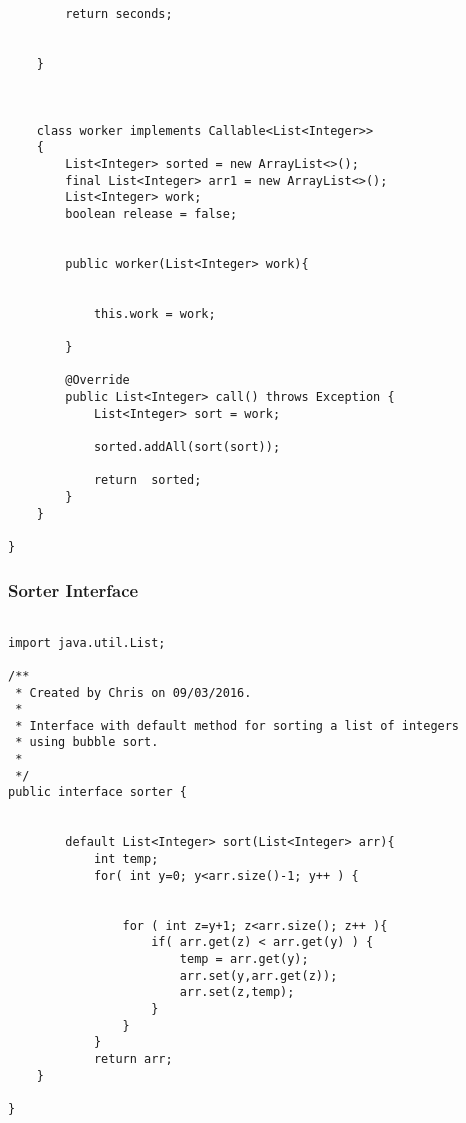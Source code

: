 \documentclass[11pt]{article}  %
\theoremstyle{definition}
\theoremstyle{remark}
\begin{document}
\begin{appendices}
\begin{lstlisting}
        return seconds;


    }



    class worker implements Callable<List<Integer>>
    {
        List<Integer> sorted = new ArrayList<>();
        final List<Integer> arr1 = new ArrayList<>();
        List<Integer> work;
        boolean release = false;


        public worker(List<Integer> work){


            this.work = work;

        }

        @Override
        public List<Integer> call() throws Exception {
            List<Integer> sort = work;

            sorted.addAll(sort(sort));

            return  sorted;
        }
    }

}

\end{lstlisting}

\newpage
\subsubsection{Sorter Interface}\label{1} 
  \begin{lstlisting}

import java.util.List;

/**
 * Created by Chris on 09/03/2016.
 *
 * Interface with default method for sorting a list of integers
 * using bubble sort.
 *
 */
public interface sorter {


        default List<Integer> sort(List<Integer> arr){
            int temp;
            for( int y=0; y<arr.size()-1; y++ ) {


                for ( int z=y+1; z<arr.size(); z++ ){
                    if( arr.get(z) < arr.get(y) ) {
                        temp = arr.get(y);
                        arr.set(y,arr.get(z));
                        arr.set(z,temp);
                    }
                }
            }
            return arr;
    }

}




\end{lstlisting}
 
\end{appendices}
\end{document}
